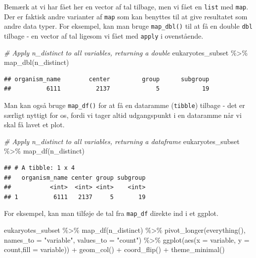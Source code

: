 \documentclass[
]{book}
\newenvironment{Shaded}{\begin{snugshade}}{\end{snugshade}}
\newcommand{\AttributeTok}[1]{\textcolor[rgb]{0.77,0.63,0.00}{#1}}
\newcommand{\CommentTok}[1]{\textcolor[rgb]{0.56,0.35,0.01}{\textit{#1}}}
\newcommand{\FunctionTok}[1]{\textcolor[rgb]{0.00,0.00,0.00}{#1}}
\newcommand{\NormalTok}[1]{#1}
\newcommand{\SpecialCharTok}[1]{\textcolor[rgb]{0.00,0.00,0.00}{#1}}
\newcommand{\StringTok}[1]{\textcolor[rgb]{0.31,0.60,0.02}{#1}}
\begin{document}
Bemærk at vi har fået her en vector af tal tilbage, men vi fået en \texttt{list} med \texttt{map}. Der er faktisk andre varianter af \texttt{map} som kan benyttes til at give resultatet som andre data typer. For eksempel, kan man bruge \texttt{map\_dbl()} til at få en double \texttt{dbl} tilbage - en vector af tal ligesom vi fået med \texttt{apply} i ovenstående.

\begin{Shaded}
\begin{Highlighting}[]
\CommentTok{\# Apply n\_distinct to all variables, returning a double}
\NormalTok{eukaryotes\_subset }\SpecialCharTok{\%\textgreater{}\%} \FunctionTok{map\_dbl}\NormalTok{(n\_distinct)}
\end{Highlighting}
\end{Shaded}

\begin{verbatim}
## organism_name        center         group      subgroup 
##          6111          2137             5            19
\end{verbatim}

Man kan også bruge \texttt{map\_df()} for at få en dataramme (\texttt{tibble}) tilbage - det er særligt nyttigt for os, fordi vi tager altid udgangspunkt i en dataramme når vi skal få lavet et plot.

\begin{Shaded}
\begin{Highlighting}[]
\CommentTok{\# Apply n\_distinct to all variables, returning a dataframe}
\NormalTok{eukaryotes\_subset }\SpecialCharTok{\%\textgreater{}\%} \FunctionTok{map\_df}\NormalTok{(n\_distinct)}
\end{Highlighting}
\end{Shaded}

\begin{verbatim}
## # A tibble: 1 x 4
##   organism_name center group subgroup
##           <int>  <int> <int>    <int>
## 1          6111   2137     5       19
\end{verbatim}

For eksempel, kan man tilføje de tal fra \texttt{map\_df} direkte ind i et ggplot.

\begin{Shaded}
\begin{Highlighting}[]
\NormalTok{eukaryotes\_subset }\SpecialCharTok{\%\textgreater{}\%} 
  \FunctionTok{map\_df}\NormalTok{(n\_distinct) }\SpecialCharTok{\%\textgreater{}\%} 
  \FunctionTok{pivot\_longer}\NormalTok{(}\FunctionTok{everything}\NormalTok{(), }\AttributeTok{names\_to =} \StringTok{"variable"}\NormalTok{, }\AttributeTok{values\_to =} \StringTok{"count"}\NormalTok{) }\SpecialCharTok{\%\textgreater{}\%}
  \FunctionTok{ggplot}\NormalTok{(}\FunctionTok{aes}\NormalTok{(}\AttributeTok{x =}\NormalTok{ variable, }\AttributeTok{y =}\NormalTok{ count,}\AttributeTok{fill =}\NormalTok{ variable)) }\SpecialCharTok{+}
  \FunctionTok{geom\_col}\NormalTok{() }\SpecialCharTok{+}
  \FunctionTok{coord\_flip}\NormalTok{() }\SpecialCharTok{+} 
  \FunctionTok{theme\_minimal}\NormalTok{()}
\end{Highlighting}
\end{Shaded}
\end{document}
